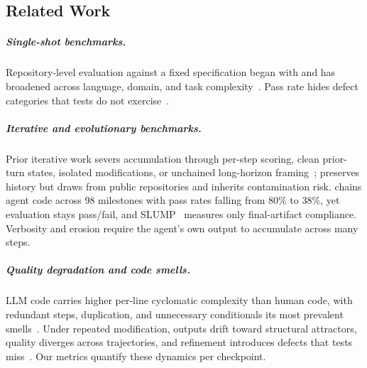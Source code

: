 \subsection{Related Work}
\label{sec:related_work}

\subparagraph{Single-shot benchmarks.} Repository-level evaluation against a fixed specification began with \citet{swe-bench} and has broadened across language, domain, and task complexity~\citep{multi-swe-bench, swe-polybench, longcli-bench, fea-bench, commit0}. Pass rate hides defect categories that tests do not exercise~\citep{swe-abs, lessleak-bench}.

\subparagraph{Iterative and evolutionary benchmarks.} Prior iterative work severs accumulation through per-step scoring, clean prior-turn states, isolated modifications, or unchained long-horizon framing~\citep{sr-eval, recode-h, codeflowbench, maintaincoder, humanevo, thai2025-swe-evo}; \citet{swe-ci} preserves history but draws from public repositories and inherits contamination risk. \citet{evoclaw} chains agent code across 98 milestones with pass rates falling from 80\% to 38\%, yet evaluation stays pass/fail, and SLUMP~\citep{slump} measures only final-artifact compliance. Verbosity and erosion require the agent's own output to accumulate across many steps.

\subparagraph{Quality degradation and code smells.} LLM code carries higher per-line cyclomatic complexity than human code, with redundant steps, duplication, and unnecessary conditionals its most prevalent smells~\citep{dou2024-whats-wrong-llm-code, abbassi2025-taxonomy-inefficiencies, cotroneo2025-human-vs-ai}. Under repeated modification, outputs drift toward structural attractors, quality diverges across trajectories, and refinement introduces defects that tests miss~\citep{iterative-readability, chen2025-patch-quality, santos2025-software-aging, scaffold-cegis, diff-fuzzing-refactoring, bohr2025-show-and-tell, interaction-smells, overcorrection-reviewers, more-rounds-more-noise, nakashima2026-agentic-prs, vibe-coding-overhead}. Our metrics quantify these dynamics per checkpoint.
